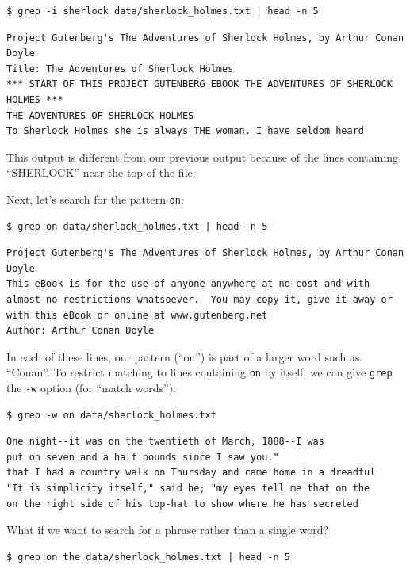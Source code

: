 \documentclass[
]{krantz}
\begin{document}
\begin{verbatim}
$ grep -i sherlock data/sherlock_holmes.txt | head -n 5
\end{verbatim}

\begin{verbatim}
Project Gutenberg's The Adventures of Sherlock Holmes, by Arthur Conan Doyle
Title: The Adventures of Sherlock Holmes
*** START OF THIS PROJECT GUTENBERG EBOOK THE ADVENTURES OF SHERLOCK HOLMES ***
THE ADVENTURES OF SHERLOCK HOLMES
To Sherlock Holmes she is always THE woman. I have seldom heard
\end{verbatim}

This output is different from our previous output
because of the lines containing ``SHERLOCK'' near the top of the file.

Next, let's search for the pattern \texttt{on}:

\begin{verbatim}
$ grep on data/sherlock_holmes.txt | head -n 5
\end{verbatim}

\begin{verbatim}
Project Gutenberg's The Adventures of Sherlock Holmes, by Arthur Conan Doyle
This eBook is for the use of anyone anywhere at no cost and with
almost no restrictions whatsoever.  You may copy it, give it away or
with this eBook or online at www.gutenberg.net
Author: Arthur Conan Doyle
\end{verbatim}

In each of these lines,
our pattern (``on'') is part of a larger word such as ``Conan''.
To restrict matching to lines containing \texttt{on} by itself,
we can give \texttt{grep} the \texttt{-w} option (for ``match words''):

\begin{verbatim}
$ grep -w on data/sherlock_holmes.txt
\end{verbatim}

\begin{verbatim}
One night--it was on the twentieth of March, 1888--I was
put on seven and a half pounds since I saw you."
that I had a country walk on Thursday and came home in a dreadful
"It is simplicity itself," said he; "my eyes tell me that on the
on the right side of his top-hat to show where he has secreted
\end{verbatim}

What if we want to search for a phrase rather than a single word?

\begin{verbatim}
$ grep on the data/sherlock_holmes.txt | head -n 5
\end{verbatim}
\end{document}
